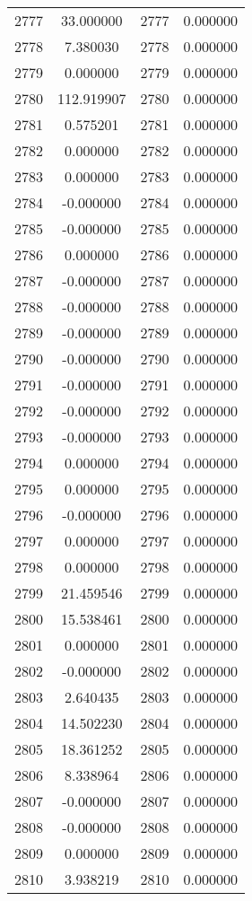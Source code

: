 \documentclass[12pt]{article}
\begin{document}
\begin{longtable}{@{}cccc@{}}
2777 & 33.000000 & 2777 & 0.000000 \\
2778 & 7.380030 & 2778 & 0.000000 \\
2779 & 0.000000 & 2779 & 0.000000 \\
2780 & 112.919907 & 2780 & 0.000000 \\
2781 & 0.575201 & 2781 & 0.000000 \\
2782 & 0.000000 & 2782 & 0.000000 \\
2783 & 0.000000 & 2783 & 0.000000 \\
2784 & -0.000000 & 2784 & 0.000000 \\
2785 & -0.000000 & 2785 & 0.000000 \\
2786 & 0.000000 & 2786 & 0.000000 \\
2787 & -0.000000 & 2787 & 0.000000 \\
2788 & -0.000000 & 2788 & 0.000000 \\
2789 & -0.000000 & 2789 & 0.000000 \\
2790 & -0.000000 & 2790 & 0.000000 \\
2791 & -0.000000 & 2791 & 0.000000 \\
2792 & -0.000000 & 2792 & 0.000000 \\
2793 & -0.000000 & 2793 & 0.000000 \\
2794 & 0.000000 & 2794 & 0.000000 \\
2795 & 0.000000 & 2795 & 0.000000 \\
2796 & -0.000000 & 2796 & 0.000000 \\
2797 & 0.000000 & 2797 & 0.000000 \\
2798 & 0.000000 & 2798 & 0.000000 \\
2799 & 21.459546 & 2799 & 0.000000 \\
2800 & 15.538461 & 2800 & 0.000000 \\
2801 & 0.000000 & 2801 & 0.000000 \\
2802 & -0.000000 & 2802 & 0.000000 \\
2803 & 2.640435 & 2803 & 0.000000 \\
2804 & 14.502230 & 2804 & 0.000000 \\
2805 & 18.361252 & 2805 & 0.000000 \\
2806 & 8.338964 & 2806 & 0.000000 \\
2807 & -0.000000 & 2807 & 0.000000 \\
2808 & -0.000000 & 2808 & 0.000000 \\
2809 & 0.000000 & 2809 & 0.000000 \\
2810 & 3.938219 & 2810 & 0.000000 \\

\end{longtable}
\end{document}
